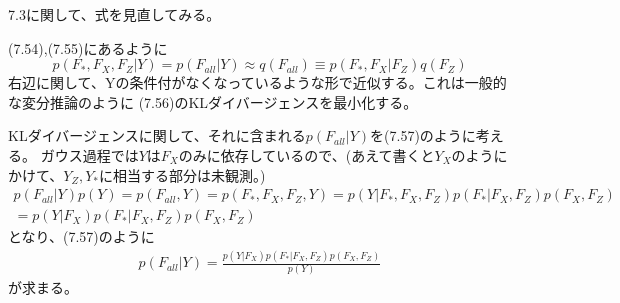 \documentclass{jsarticle}
\begin{document}
7.3に関して、式を見直してみる。

(7.54),(7.55)にあるように
\begin{equation}
p(F_*, F_X, F_Z | Y) = p(F_{all} | Y) \approx q(F_{all}) \equiv p(F_*, F_X | F_Z) q(F_Z)
\end{equation}
右辺に関して、Yの条件付がなくなっているような形で近似する。これは一般的な変分推論のように
(7.56)のKLダイバージェンスを最小化する。

KLダイバージェンスに関して、それに含まれる$p(F_{all} | Y)$を(7.57)のように考える。
ガウス過程では$Y$は$F_X$のみに依存しているので、(あえて書くと$Y_X$のようにかけて、$Y_Z,Y_*$に相当する部分は未観測。)
\begin{equation}
\begin{split}
p(F_{all} | Y)p(Y) = p(F_{all}, Y) = p(F_*, F_X, F_Z, Y) = p(Y | F_*, F_X, F_Z) p(F_* | F_X, F_Z) p(F_X, F_Z)\\
=p(Y | F_X) p(F_* | F_X, F_Z) p(F_X, F_Z)
\end{split}
\end{equation}
となり、(7.57)のように
\begin{equation}
\begin{split}
p(F_{all} | Y) = \frac{p(Y | F_X) p(F_* | F_X, F_Z) p(F_X, F_Z)}{p(Y)}
\end{split}
\end{equation}
が求まる。
\end{document}
